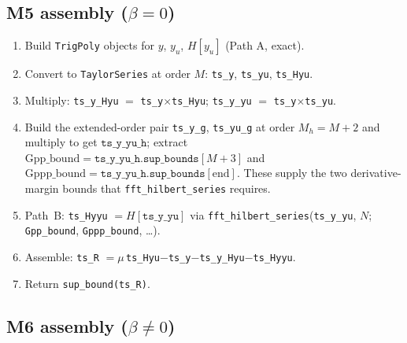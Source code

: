 \documentclass[11pt]{article}
\theoremstyle{definition}
\begin{document}
\subsection{M5 assembly (\texorpdfstring{$\beta=0$}{beta=0})}

\begin{enumerate}
  \item Build \texttt{TrigPoly} objects for $y$, $y_u$, $H[y_u]$ (Path A, exact).
  \item Convert to \texttt{TaylorSeries} at order $M$: \texttt{ts\_y}, \texttt{ts\_yu}, \texttt{ts\_Hyu}.
  \item Multiply: \texttt{ts\_y\_Hyu} $=$ \texttt{ts\_y}$\times$\texttt{ts\_Hyu};
        \texttt{ts\_y\_yu} $=$ \texttt{ts\_y}$\times$\texttt{ts\_yu}.
  \item Build the extended-order pair \texttt{ts\_y\_g}, \texttt{ts\_yu\_g}
        at order $M_h = M + 2$ and multiply to get $\texttt{ts\_y\_yu\_h}$;
        extract
        $\mathrm{Gpp\_bound} = \texttt{ts\_y\_yu\_h.sup\_bounds}[M{+}3]$ and
        $\mathrm{Gppp\_bound} = \texttt{ts\_y\_yu\_h.sup\_bounds}[\mathrm{end}]$.
        These supply the two derivative-margin bounds that
        \texttt{fft\_hilbert\_series} requires.
  \item Path~B: \texttt{ts\_Hyyu} $= H[\texttt{ts\_y\_yu}]$ via
        \texttt{fft\_hilbert\_series}(\texttt{ts\_y\_yu}, $N$;
        \texttt{Gpp\_bound}, \texttt{Gppp\_bound}, \ldots).
  \item Assemble: \texttt{ts\_R} $=\mu\,$\texttt{ts\_Hyu}$-$\texttt{ts\_y}$-$\texttt{ts\_y\_Hyu}$-$\texttt{ts\_Hyyu}.
  \item Return \texttt{sup\_bound(ts\_R)}.
\end{enumerate}

\subsection{M6 assembly (\texorpdfstring{$\beta\neq 0$}{beta neq 0})}
\end{document}

